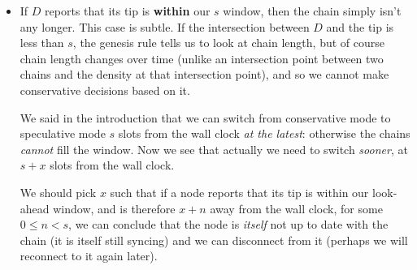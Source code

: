 \begin{itemize}
\item If $D$ reports that its tip is \textbf{within} our $s$ window, then the
chain simply isn't any longer. This case is subtle. If the intersection between
$D$ and the tip is less than $s$, the genesis rule tells us to look at chain
length, but of course chain length changes over time (unlike an intersection
point between two chains and the density at that intersection point), and so we
cannot make conservative decisions based on it.

We said in the introduction that we can switch from conservative mode to
speculative mode $s$ slots from the wall clock \emph{at the latest}: otherwise
the chains \emph{cannot} fill the window. Now we see that actually we need to
switch \emph{sooner}, at $s + x$ slots from the wall clock.

\begin{center}
\end{center}

We should pick $x$ such that if a node reports that its tip is within our
look-ahead window, and is therefore $x + n$ away from the wall clock,
for some $0 \le n < s$, we can conclude that the node is \emph{itself} not
up to date with the chain (it is itself still syncing) and we can disconnect
from it (perhaps we will reconnect to it again later).


\end{itemize}
